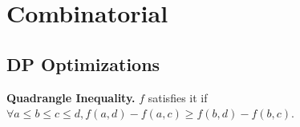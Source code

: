 \chapter{Combinatorial}


\section{DP Optimizations}
\textbf{Quadrangle Inequality.} $f$ satisfies it if $\forall a \le b \le c \le d, f(a, d) - f(a, c) \ge f(b, d) - f(b, c)$.
